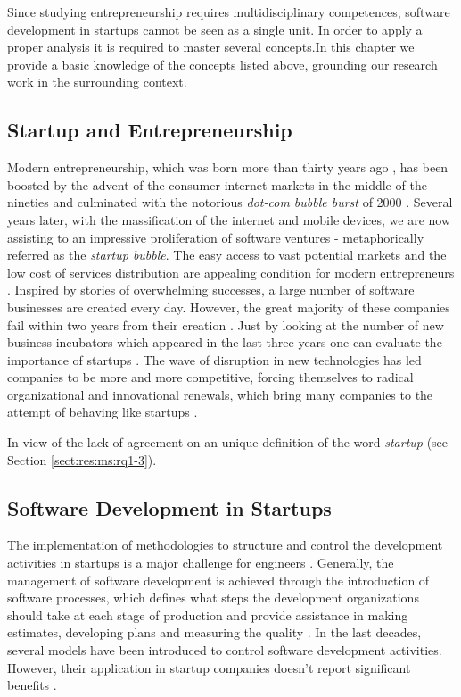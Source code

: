 \documentclass[final,5p,times,twocolumn]{elsarticle}
\begin{document}
 Since studying entrepreneurship requires multidisciplinary competences, software development in startups cannot be seen as a single unit. In order to apply a proper analysis it is required to master several concepts.In this chapter we provide a basic knowledge of the concepts listed above, grounding our research work in the surrounding context.


\subsection{Startup and Entrepreneurship}
 \label{sect:bg:entrepreneurship}
Modern entrepreneurship, which was born more than thirty years ago \cite{storey1982entrepreneurship}, has been boosted by the advent of the consumer internet markets in the middle of the nineties and culminated with the notorious \textit{dot-com bubble burst} of 2000 \cite{Perkins:1999:IBI:555126}. Several years later, with the massification of the internet and mobile devices, we are now assisting to an impressive proliferation of software ventures - metaphorically referred as the \textit{startup bubble}. The easy access to vast potential markets and the low cost of services distribution are appealing condition for modern entrepreneurs \cite{Marmer2011}. Inspired by stories of overwhelming successes, a large number of software businesses are created every day. However, the great majority of these companies fail within two years from their creation \cite{Crowne2002}.
Just by looking at the number of new business incubators which appeared in the last three years one can evaluate the importance of startups \cite{Grimaldi2005}. The wave of disruption in new technologies has led companies to be more and more competitive, forcing themselves to radical organizational and innovational renewals,  which bring many companies to the attempt of behaving like startups \cite{Christensen1997}.

In view of the lack of agreement on an unique definition of the word \textit{startup} (see Section \ref{sect:res:ms:rq1-3}).

\subsection{Software Development in Startups}
 \label{sect:bg:swdev}
The implementation of methodologies to structure and control the development activities in startups is a major challenge for engineers \cite{Coleman2008}. Generally, the management of software development is achieved through the introduction of software processes, which defines what steps the development organizations should take at each stage of production and provide assistance in making estimates, developing plans and measuring the quality \cite{Chroust1996}. In the last decades, several models have been introduced to control software development activities. However, their application in startup companies doesn’t report significant benefits \cite{Coleman2008a, Coleman2008, Sutton2000}.
\end{document}
